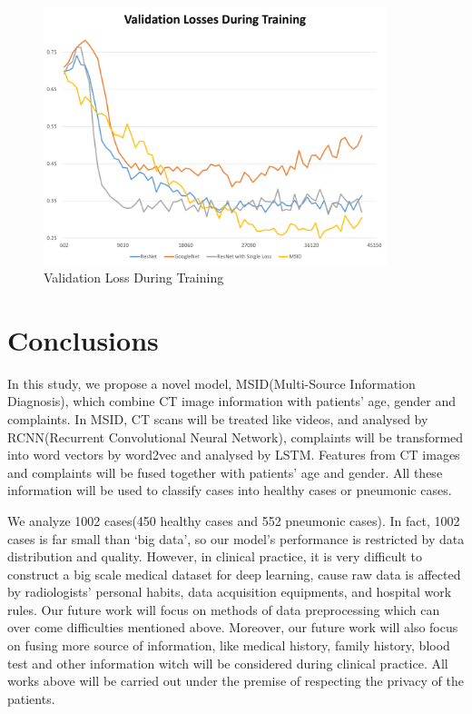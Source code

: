 \documentclass[runningheads]{llncs}
\begin{document}
\begin{figure}[htb]
    \centerline{\includegraphics[width=100mm]{losses.pdf}}
    \vspace{-0cm}
    \caption{Validation Loss During Training}
    \vspace{-0cm}
    \label{loss}
    \end{figure}

\section{Conclusions}
\label{conclude}
In this study, we propose a novel model, MSID(Multi-Source Information Diagnosis), which combine CT image information with patients' age, gender and complaints. In MSID, CT scans will be treated like videos, and analysed by RCNN(Recurrent Convolutional Neural Network), complaints will be transformed into word vectors by word2vec and analysed by LSTM. Features from CT images and complaints will be fused together with patients' age and gender. All these information will be used to classify cases into healthy cases or pneumonic cases.

We analyze 1002 cases(450 healthy cases and 552 pneumonic cases). In fact, 1002 cases is far small than `big data', so our model's performance is restricted by data distribution and quality. However, in clinical practice, it is very difficult to construct a big scale medical dataset for deep learning, cause raw data is affected by radiologists' personal habits, data acquisition equipments, and hospital work rules. Our future work will focus on methods of data preprocessing which can over come difficulties mentioned above.
Moreover, our future work will also focus on fusing more source of information, like medical history, family history, blood test and other information witch will be considered during clinical practice. All works above will be carried out under the premise of respecting the privacy of the patients.
 


  
\end{document}
